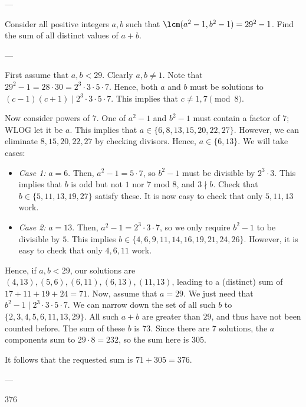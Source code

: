 
---

Consider all positive integers $a,b$ such that $\lcm(a^2-1,b^2-1)=29^2-1$. Find the sum of all distinct values of $a+b$.

---

First assume that $a,b<29$. Clearly $a,b\ne 1$. Note that $29^2-1=28\cdot 30=2^3\cdot 3\cdot 5\cdot 7$. Hence, both $a$ and $b$ must be solutions to $(c-1)(c+1)\mid 2^3\cdot 3\cdot 5\cdot 7$. This implies that $c\neq 1,7\pmod8$.

Now consider powers of $7$. One of $a^2-1$ and $b^2-1$ must contain a factor of $7$; WLOG let it be $a$. This implies that $a\in\{6,8,13,15,20,22,27\}$. However, we can eliminate $8,15,20,22,27$ by checking divisors. Hence, $a\in\{6,13\}$. We will take cases:
\begin{itemize}
    \item \textit{Case 1:} $a=6$. Then, $a^2-1=5\cdot 7$, so $b^2-1$ must be divisible by $2^3\cdot 3$. This implies that $b$ is odd but not $1$ nor $7$ mod $8$, and $3\nmid b$. Check that $b\in\{5,11,13,19,27\}$ satisfy these. It is now easy to check that only $5,11,13$ work.
    \item \textit{Case 2:} $a=13$. Then, $a^2-1=2^3\cdot 3\cdot 7$, so we only require $b^2-1$ to be divisible by $5$. This implies $b\in\{4,6,9,11,14,16,19,21,24,26\}$. However, it is easy to check that only $4,6,11$ work.
\end{itemize}
Hence, if $a,b<29$, our solutions are $(4,13),(5,6),(6,11),(6,13),(11,13)$, leading to a (distinct) sum of $17+11+19+24=71$. Now, assume that $a=29$. We just need that $b^2-1\mid 2^3\cdot 3\cdot 5\cdot 7$. We can narrow down the set of all such $b$ to $\{2,3,4,5,6,11,13,29\}$. All such $a+b$ are greater than $29$, and thus have not been counted before. The sum of these $b$ is $73$. Since there are $7$ solutions, the $a$ components sum to $29\cdot 8=232$, so the sum here is $305$.

It follows that the requested sum is $71+305=376$.

---

376

